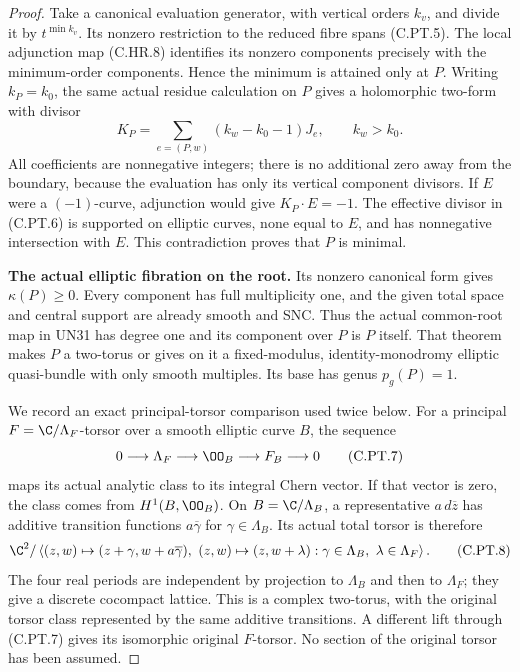 \begin{proof}
Take a canonical evaluation generator, with vertical orders
$k_v$, and divide it by $t^{\min k_v}$. Its nonzero restriction
to the reduced fibre spans (C.PT.5). The local adjunction map
(C.HR.8) identifies its nonzero components precisely with the
minimum-order components. Hence the minimum is attained
only at $P$. Writing $k_P=k_0$, the same actual residue
calculation on $P$ gives a holomorphic two-form with divisor
\[
          K_P=\sum_{e=(P,w)}(k_w-k_0-1)J_e,\qquad
                          k_w>k_0.
 \tag{C.PT.6}
\]
All coefficients are nonnegative integers; there is no
additional zero away from the boundary, because the
evaluation has only its vertical component divisors.
If $E$ were a $(-1)$-curve, adjunction would give
$K_P\cdot E=-1$. The effective divisor in (C.PT.6)
is supported on elliptic curves, none equal to $E$,
and has nonnegative intersection with $E$. This
contradiction proves that $P$ is minimal.

\par\medskip\noindent\textbf{The actual elliptic fibration on the root.}
Its nonzero canonical form gives $\kappa(P)\ge0$.
Every component has full multiplicity one, and the
given total space and central support are already
smooth and SNC. Thus the actual common-root map in
UN31 has degree one and its component over $P$ is
$P$ itself. That theorem makes $P$ a two-torus or
gives on it a fixed-modulus, identity-monodromy
elliptic quasi-bundle with only smooth multiples.
Its base has genus $p_g(P)=1$.

We record an exact principal-torsor comparison used twice
below. For a principal $F=\C/\Lambda_F$-torsor over a
smooth elliptic curve $B$, the sequence
\[
 0\longrightarrow\Lambda_F
 \longrightarrow\OO_B\longrightarrow F_B
 \longrightarrow0
 \tag{C.PT.7}
\]
maps its actual analytic class to its integral Chern
vector. If that vector is zero, the class comes from
$H^1(B,\OO_B)$. On $B=\C/\Lambda_B$, a representative
$a\,d\overline z$ has additive transition functions
$a\overline\gamma$ for $\gamma\in\Lambda_B$.
Its actual total torsor is therefore
\[
 \C^2/
 \left\langle
  (z,w)\mapsto(z+\gamma,w+a\overline\gamma),\
  (z,w)\mapsto(z,w+\lambda):
   \gamma\in\Lambda_B,\ \lambda\in\Lambda_F
 \right\rangle .
 \tag{C.PT.8}
\]
The four real periods are independent by projection
to $\Lambda_B$ and then to $\Lambda_F$; they give
a discrete cocompact lattice. This is a complex
two-torus, with the original torsor class represented
by the same additive transitions. A different lift
through (C.PT.7) gives its isomorphic original
$F$-torsor. No section of the original torsor has
been assumed.


\end{proof}
